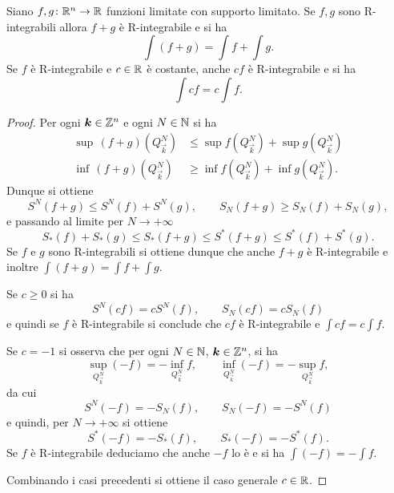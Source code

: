 \begin{theorem}
Siano $f,g\colon {\mathbb R}^n \to {\mathbb R}$ funzioni limitate con supporto limitato.
Se $f,g$ sono R-integrabili allora $f+g$ è R-integrabile e si ha 
\[
    \int (f+g) = \int\!\! f + \int\!\! g.
\]
Se $f$ è R-integrabile e $c\in {\mathbb R}$ è costante, anche $c f$ è R-integrabile 
e si ha 
\[
    \int\!\! c f = c \!\int\!\! f.
\]
\end{theorem}
\begin{proof}
Per ogni $\boldsymbol k\in{\mathbb Z}^n$ e ogni $N\in {\mathbb N}$
si ha
\begin{align*}
  \sup\, (f+g)(Q^N_{\vec k}) &\le \sup f(Q^N_{\vec k}) + \sup g(Q^N_{\vec k})\\
  \inf\, (f+g)(Q^N_{\vec k}) &\ge \inf f(Q^N_{\vec k}) + \inf g(Q^N_{\vec k}).
\end{align*}
Dunque si ottiene
\[
    S^N(f+g) \le S^N(f) + S^N(g),  \qquad
    S_N(f+g) \ge S_N(f) + S_N(g), 
\]
e passando al limite per $N\to +\infty$ 
\[
   S_*(f) + S_*(g) \le S_*(f+g) \le S^*(f+g) \le S^*(f) + S^*(g).
\]
Se $f$ e $g$ sono R-integrabili si ottiene dunque che anche $f+g$ 
è R-integrabile e inoltre $\int (f+g) = \int\! f + \int\! g$.

Se $c \ge 0$ si ha 
\[
   S^N(c f) = c S^N(f), \qquad S_N(c f) = c S_N(f)
\]
e quindi se $f$ è R-integrabile si conclude 
che $c f$ è R-integrabile e $\int\! c f = c \int\! f$.

Se $c = -1$ si osserva che per ogni $N\in {\mathbb N}$, $\boldsymbol k\in {\mathbb Z}^n$, 
si ha 
\[
   \sup_{Q^N_{\vec k}} (-f) = -\inf_{Q^N_{\vec k}} f,
   \qquad 
   \inf_{Q^N_{\vec k}} (-f) = -\sup_{Q^N_{\vec k}} f,
\]
da cui 
\[
    S^N(-f) = -S_N(f), \qquad S_N(-f) = -S^N(f)
\]
e quindi, per $N\to +\infty$ si ottiene 
\[
  S^*(-f) = -S_*(f), \qquad S_*(-f) = - S^*(f).
\]
Se $f$ è R-integrabile deduciamo che anche $-f$ lo è e si ha 
$\int (-f) = -\int\! f$.

Combinando i casi precedenti si ottiene il caso generale $c \in {\mathbb R}$.
\end{proof}

